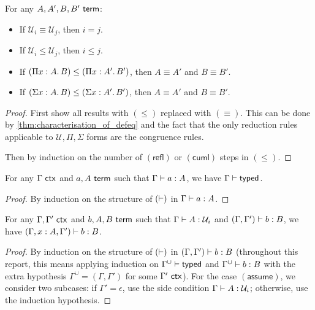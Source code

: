 \documentclass[twoside]{report}
\begin{document}
\begin{proposition}
    \label{thm:injectivity_of_type_formers}
    For any $A, A', B, B' \ \mathsf{term}$:
    \begin{itemize}[noitemsep]
        \item If $\mathcal U_i \equiv \mathcal U_j$, then $i = j$.
        \item If $\mathcal U_i \leq \mathcal U_j$, then $i \leq j$.
        \item If $(\Pi{x} : {A}.\,{B}) \leq (\Pi{x} : {A'}.\,{B'})$, then $A \equiv A'$ and $B \equiv B'$.
        \item If $(\Sigma{x} : {A}.\,{B}) \leq (\Sigma{x} : {A'}.\,{B'})$, then $A \equiv A'$ and $B \equiv B'$.
    \end{itemize}
\end{proposition}

\begin{proof}
    First show all results with $(\leq)$ replaced with $(\equiv)$. This can be done by \cref{thm:characterisation_of_defeq} and the fact that the only reduction rules applicable to $\mathcal U, \Pi, \Sigma$ forms are the congruence rules.

    Then by induction on the number of $(\mathsf{refl})$ or $(\mathsf{cuml})$ steps in $(\leq)$.
\end{proof}

\begin{proposition}[Context]
    \label{thm:context}
    For any $\Gamma \ \mathsf{ctx}$ and $a, A \ \mathsf{term}$ such that $\Gamma \vdash a : A$, we have $\Gamma \vdash \mathsf{typed}$.
\end{proposition}

\begin{proof}
    By induction on the structure of $(\vdash)$ in $\Gamma \vdash a : A$.
\end{proof}

\begin{proposition}[Weakening]
    \label{thm:weakening}
    For any $\Gamma, \Gamma' \ \mathsf{ctx}$ and $b, A, B \ \mathsf{term}$ such that $\Gamma \vdash A : \mathcal U_i$ and $(\Gamma, \Gamma') \vdash b : B$, we have $(\Gamma, x : A, \Gamma') \vdash b : B$.
\end{proposition}

\begin{proof}
    By induction on the structure of $(\vdash)$ in $(\Gamma, \Gamma') \vdash b : B$ (throughout this report, this means applying induction on $\Gamma^\cup \vdash \mathsf{typed}$ and $\Gamma^\cup \vdash b : B$ with the extra hypothesis $\Gamma^\cup = (\Gamma, \Gamma')$ for some $\Gamma' \ \mathsf{ctx}$). For the case $(\mathsf{assume})$, we consider two subcases: if $\Gamma' = \epsilon$, use the side condition $\Gamma \vdash A : \mathcal U_i$; otherwise, use the induction hypothesis.
\end{proof}
\end{document}
